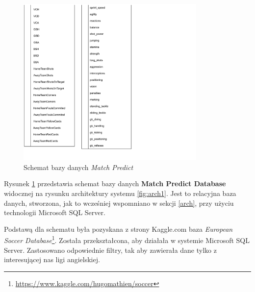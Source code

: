 \begin{figure}[h]
\ContinuedFloat
    \centering
  \includegraphics[width=0.83\textwidth]{figures/match_predict_schema_2.png}%
  \addtocounter{figure}{1}
  \caption{Schemat bazy danych \textit{Match Predict}}
    
  \label{fig:match_predict_schema}
    
\end{figure}
 
\noindent Rysunek \ref{fig:match_predict_schema} przedstawia schemat bazy danych \textbf{Match Predict Database} widocznej na rysunku architektury systemu \ref{fig:arch1}. Jest to relacyjna baza danych, stworzona, jak to wcześniej wspomniano w sekcji \ref{arch}, przy użyciu technologii Microsoft SQL Server.

Podstawą dla schematu była pozyskana z strony Kaggle.com baza \textit{European Soccer Database}\footnote{\url{https://www.kaggle.com/hugomathien/soccer}}. Została przekształcona, aby działała w systemie Microsoft SQL Server. Zastosowano odpowiednie filtry, tak aby zawierała dane tylko z interesującej nas ligi angielskiej.

